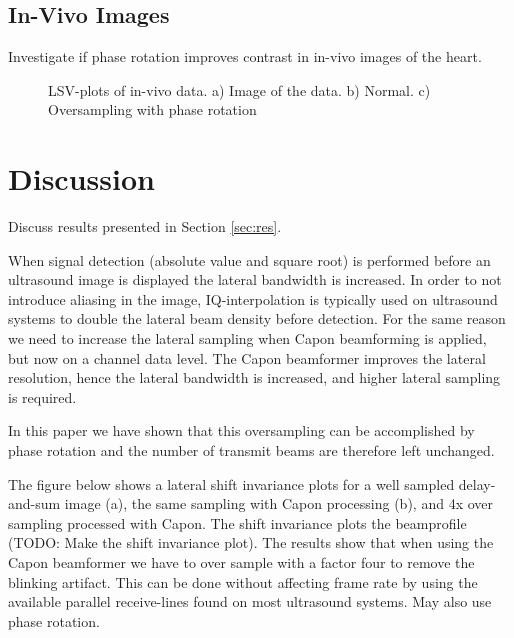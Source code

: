 \documentclass[journal]{IEEEtran}
\newcommand{\img}{img/}
\begin{document}
\subsection{In-Vivo Images}
Investigate if phase rotation improves contrast in in-vivo images of the heart.

\begin{figure*}[!t]
\centerline{
\hfill{}
\hfill{}
}
\caption{LSV-plots of in-vivo data. a) Image of the data. b) Normal. c) Oversampling with phase rotation}
\label{fig:das}
\end{figure*}

\section{Discussion}\label{sec:dis}
Discuss results presented in Section \ref{sec:res}.

When signal detection (absolute value and square root) is performed before an ultrasound image is displayed the lateral bandwidth is increased. In order to not introduce aliasing in the image, IQ-interpolation is typically used on ultrasound systems to double the lateral beam density before detection. For the same reason we need to increase the lateral sampling when Capon beamforming is applied, but now on a channel data level. The Capon beamformer improves the lateral resolution, hence the lateral bandwidth is increased, and higher lateral sampling is required. 

In this paper we have shown that this oversampling can be accomplished by phase rotation and the number of transmit beams are therefore left unchanged. 

The figure below shows a lateral shift invariance plots for a well sampled delay-and-sum image (a), the same sampling with Capon processing (b), and 4x over sampling processed with Capon. The shift invariance plots the beamprofile (TODO: Make the shift invariance plot). The results show that when using the Capon beamformer we have to over sample with a factor four to remove the blinking artifact. This can be done without affecting frame rate by using the available parallel receive-lines found on most ultrasound systems. May also use phase rotation. 
\end{document}
